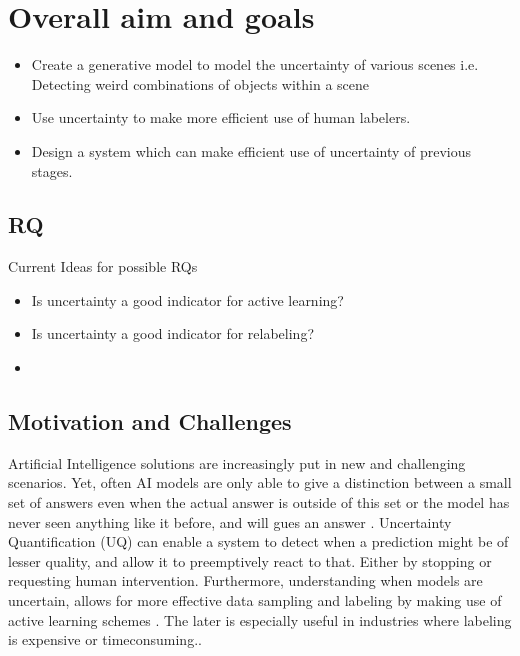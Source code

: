 \section{Overall aim and goals}\label{sec:goals}
\begin{itemize}
    \item Create a generative model to model the uncertainty of various scenes
          \subitem i.e. Detecting weird combinations of objects within a scene
    \item Use uncertainty to make more efficient use of human labelers.
    \item Design a system which can make efficient use of uncertainty of previous stages.
\end{itemize}


\subsection{RQ}
Current Ideas for possible RQs

\begin{itemize}
    \item Is uncertainty a good indicator for active learning?
    \item Is uncertainty a good indicator for relabeling?
    \item
\end{itemize}

\subsection{Motivation and Challenges}

Artificial Intelligence solutions are increasingly put in new and challenging scenarios. Yet, often AI models are only able to give a distinction between a small set of answers even when the actual answer is outside of this set  or the model has never seen anything like it before, and will gues an answer . Uncertainty Quantification (UQ) can enable a system to detect when a prediction might be of lesser quality, and allow it to preemptively react to that. Either by stopping or requesting human intervention. Furthermore, understanding when models are uncertain, allows for more effective data sampling and labeling by making use of active learning schemes . The later is especially useful in industries where labeling is expensive or timeconsuming..

